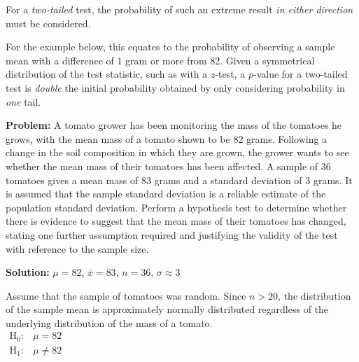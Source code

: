 \documentclass[
  11pt,
]{book}
\begin{document}
For a \emph{two-tailed} test, the probability of such an extreme result \emph{in either direction} must be considered.

For the example below, this equates to the probability of observing a sample mean with a difference of 1 gram or more from 82. Given a symmetrical distribution of the test statistic, such as with a \(z\)-test, a \(p\)-value for a two-tailed test is \emph{double} the initial probability obtained by only considering probability in \emph{one} tail.

\begin{tcolorbox}[title=Example,colback=RoyalBlue!1!,colframe=RoyalBlue]
\textbf{Problem:} A tomato grower has been monitoring the mass of the tomatoes he grows, with the mean mass of a tomato shown to be 82 grams. Following a change in the soil composition in which they are grown, the grower wants to see whether the mean mass of their tomatoes has been affected. A sample of 36 tomatoes gives a mean mass of 83 grams and a standard deviation of 3 grams. It is assumed that the sample standard deviation is a reliable estimate of the population standard deviation. Perform a hypothesis test to determine whether there is evidence to suggest that the mean mass of their tomatoes has changed, stating one further assumption required and justifying the validity of the test with reference to the sample size.

\tcblower
\textbf{Solution:}
$\mu=\text{82}$, $\bar{x}=\text{83}$, $n=\text{36}$, $\sigma\approx \text{3}$\\

\vspace{0.01cm}

Assume that the sample of tomatoes was random. Since $n>\text{20}$, the distribution of the sample mean is approximately normally distributed regardless of the underlying distribution of the mass of a tomato.\\

\vspace{0.3cm}
\begin{math}
\begin{array}{ll}
      \text{H}_\text{0}: & \mu=\text{82}\\
      \text{H}_\text{1}: & \mu\ne \text{82}
    \end{array}
\end{math}

\vspace{0.5cm}


\end{tcolorbox}
\end{document}
